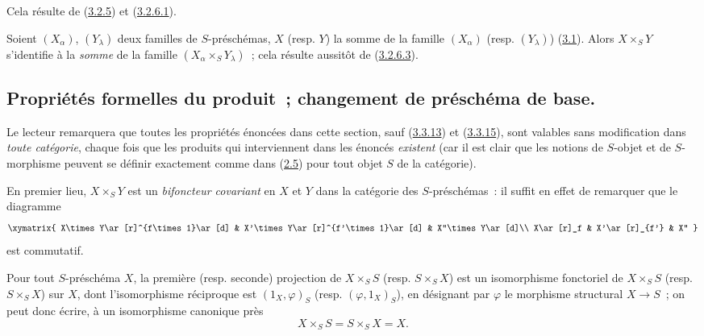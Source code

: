 Cela résulte de (\hyperref[I.3.2.5-fr]{3.2.5}) et
(\hyperref[I.3.2.6.1-fr]{3.2.6.1}).

\begin{env}[3.2.8]
\label{I.3.2.8-fr}
Soient $(X_\alpha)$, $(Y_\lambda)$ deux familles de $S$-préschémas, $X$
(resp. $Y$) la somme de la famille $(X_\alpha)$ (resp. $(Y_\lambda)$)
(\hyperref[subsection:I.3.1-fr]{3.1}). Alors $X\times_S Y$ s'identifie à la
\emph{somme} de la famille $(X_\alpha\times_S Y_\lambda)$~; cela résulte
aussitôt de (\hyperref[I.3.2.6.3-fr]{3.2.6.3}).
\end{env}

\subsection{Propriétés formelles du produit~; changement de préschéma de base.}
\label{subsection:I.3.3-fr}

\begin{env}[3.3.1]
\label{I.3.3.1-fr}
Le lecteur remarquera que toutes les propriétés énoncées dans cette section,
sauf (\hyperref[I.3.3.13-fr]{3.3.13}) et
(\hyperref[I.3.3.15-fr]{3.3.15}), sont valables sans modification dans
\emph{toute catégorie}, chaque fois que les produits qui interviennent dans
les énoncés \emph{existent} (car il est clair que les notions de $S$-objet et
de $S$-morphisme peuvent se définir exactement comme dans
(\hyperref[subsection:I.2.5-fr]{2.5}) pour tout objet $S$ de la catégorie).
\end{env}

\begin{env}[3.3.2]
\label{I.3.3.2-fr}
En premier lieu, $X\times_S Y$ est un \emph{bifoncteur covariant} en $X$ et
$Y$ dans la catégorie des $S$-préschémas~: il suffit en effet de remarquer
que le diagramme
\[
  \xymatrix{
    X\times Y\ar[r]^{f\times 1}\ar[d] &
    X'\times Y\ar[r]^{f'\times 1}\ar[d] &
    X''\times Y\ar[d]\\
    X\ar[r]_f & X'\ar[r]_{f'} & X''
  }
\]
est commutatif.
\end{env}

\begin{proposition}[3.3.3]
\label{I.3.3.3-fr}
Pour tout $S$-préschéma $X$, la première \textup{(resp.} seconde) projection de
$X\times_S S$ \textup{(resp. $S\times_S X$)} est un isomorphisme fonctoriel de
$X\times_S S$ \textup{(resp. $S\times_S X$)} sur $X$, dont l'isomorphisme réciproque
est $(1_X,\varphi)_S$ \textup{(resp. $(\varphi,1_X)_S$)}, en désignant par $\varphi$
le morphisme structural $X\to S$~; on peut donc écrire, à un isomorphisme
canonique près
\[
  X\times_S S=S\times_S X=X.
\]
\end{proposition}

